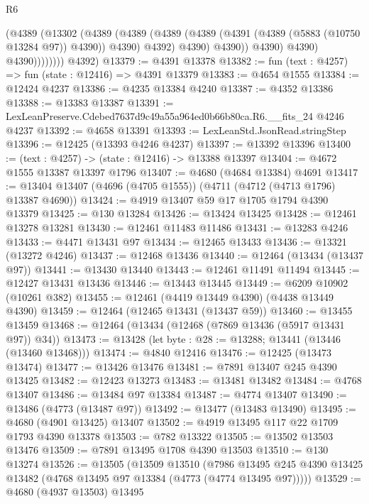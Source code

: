 \begin{lexlean}{R6}
\begin{coremodule}
                        (@4389
                          (@13302
                            (@4389
                              (@4389
                                (@4389
                                  (@4389 (@4391 (@4389 (@5883 (@10750 @13284 @97)) @4390)) @4390)
                                  @4392)
                                @4390)
                              @4390))
                          @4390)
                        @4390)
                      @4390))))))))
      @4392)
@13379 := @4391 @13378
@13382 := fun (text : @4257) => fun (state : @12416) => @4391 @13379
@13383 := @4654 @1555
@13384 := @12424 @4237
@13386 := @4235 @13384 @4240
@13387 := @4352 @13386
@13388 := @13383 @13387
@13391 := LexLeanPreserve.Cdebed7637d9c49a55a964ed0b66b80ca.R6.__fits_24 @4246 @4237
@13392 := @4658 @13391
@13393 := LexLeanStd.JsonRead.stringStep
@13396 := @12425 (@13393 @4246 @4237)
@13397 := @13392 @13396
@13400 := (text : @4257) -> (state : @12416) -> @13388 @13397
@13404 := @4672 @1555 @13387 @13397 @1796
@13407 := @4680 (@4684 @13384) @4691
@13417 := @13404 @13407 (@4696 (@4705 @1555)) (@4711 (@4712 (@4713 @1796) @13387 @4690))
@13424 := @4919 @13407 @59 @17 @1705 @1794 @4390 @13379
@13425 := @130 @13284
@13426 := @13424 @13425
@13428 := @12461 @13278 @13281
@13430 := @12461 @11483 @11486
@13431 := @13283 @4246
@13433 := @4471 @13431 @97
@13434 := @12465 @13433
@13436 := @13321 (@13272 @4246)
@13437 := @12468 @13436
@13440 := @12464 (@13434 (@13437 @97))
@13441 := @13430 @13440
@13443 := @12461 @11491 @11494
@13445 := @12427 @13431 @13436
@13446 := @13443 @13445
@13449 := @6209 @10902 (@10261 @382)
@13455 := @12461 (@4419 @13449 @4390) (@4438 @13449 @4390)
@13459 := @12464 (@12465 @13431 (@13437 @59))
@13460 := @13455 @13459
@13468 := @12464 (@13434 (@12468 (@7869 @13436 (@5917 @13431 @97)) @34))
@13473 := @13428 (let byte : @28 := @13288; @13441 (@13446 (@13460 @13468)))
@13474 := @4840 @12416
@13476 := @12425 (@13473 @13474)
@13477 := @13426 @13476
@13481 := @7891 @13407 @245 @4390 @13425
@13482 := @12423 @13273
@13483 := @13481 @13482
@13484 := @4768 @13407
@13486 := @13484 @97 @13384
@13487 := @4774 @13407
@13490 := @13486 (@4773 (@13487 @97))
@13492 := @13477 (@13483 @13490)
@13495 := @4680 (@4901 @13425) @13407
@13502 := @4919 @13495 @117 @22 @1709 @1793 @4390 @13378
@13503 := @782 @13322
@13505 := @13502 @13503 @13476
@13509 := @7891 @13495 @1708 @4390 @13503
@13510 := @130 @13274
@13526 := @13505
    (@13509
      @13510
      (@7986 @13495 @245 @4390 @13425 @13482 (@4768 @13495 @97 @13384 (@4773 (@4774 @13495 @97)))))
@13529 := @4680 (@4937 @13503) @13495

\end{coremodule}
\end{lexlean}
